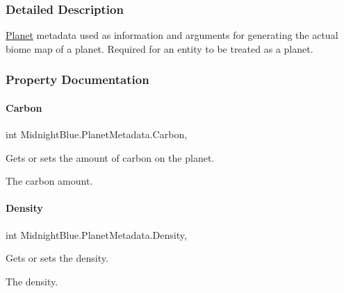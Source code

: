 \subsubsection{Detailed Description}
\hyperlink{class_midnight_blue_1_1_planet}{Planet} metadata used as information and arguments for generating the actual biome map of a planet. Required for an entity to be treated as a planet. 



\subsubsection{Property Documentation}
\hypertarget{class_midnight_blue_1_1_planet_metadata_abb8cb39cd167a260d08f505ad038eb90}{}\label{class_midnight_blue_1_1_planet_metadata_abb8cb39cd167a260d08f505ad038eb90} 
\paragraph{\texorpdfstring{Carbon}{Carbon}}
{\footnotesize\ttfamily int Midnight\+Blue.\+Planet\+Metadata.\+Carbon\hspace{0.3cm}{\ttfamily [get]}, {\ttfamily [set]}}



Gets or sets the amount of carbon on the planet. 

The carbon amount.\hypertarget{class_midnight_blue_1_1_planet_metadata_a6f3fe53543f04e24f107c6464b03d885}{}\label{class_midnight_blue_1_1_planet_metadata_a6f3fe53543f04e24f107c6464b03d885} 
\paragraph{\texorpdfstring{Density}{Density}}
{\footnotesize\ttfamily int Midnight\+Blue.\+Planet\+Metadata.\+Density\hspace{0.3cm}{\ttfamily [get]}, {\ttfamily [set]}}



Gets or sets the density. 

The density.\hypertarget{class_midnight_blue_1_1_planet_metadata_ada2ca7bb1b67a18098a2fadd7f958ec9}{}\label{class_midnight_blue_1_1_planet_metadata_ada2ca7bb1b67a18098a2fadd7f958ec9} 
